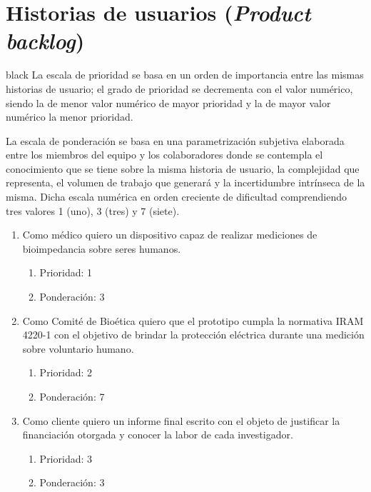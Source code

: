 \documentclass[11pt]{charter}
\begin{document}
\pagebreak

\section{Historias de usuarios (\textit{Product backlog})}
\label{sec:backlog}

\begin{consigna}{black}
La escala de prioridad se basa en un orden de importancia entre las mismas historias de usuario; el grado de prioridad se decrementa con el valor numérico, siendo la de menor valor numérico de mayor prioridad y la de mayor valor numérico la menor prioridad.

La escala de ponderación se basa en una parametrización subjetiva elaborada entre los miembros del equipo y los colaboradores donde se contempla el conocimiento que se tiene sobre la misma historia de usuario, la complejidad que representa, el volumen de trabajo que generará y la incertidumbre intrínseca de la misma. Dicha escala numérica en orden creciente de dificultad comprendiendo tres valores 1 (uno), 3 (tres) y 7 (siete).
\begin{enumerate}
\item Como médico quiero un dispositivo capaz de realizar mediciones de bioimpedancia sobre seres humanos.
\begin{enumerate}
	\item Prioridad: 1
	\item Ponderación: 3
\end{enumerate}

\item Como Comité de Bioética quiero que el prototipo cumpla la normativa IRAM 4220-1 con el objetivo de brindar la protección eléctrica durante una medición sobre voluntario humano.
\begin{enumerate}
	\item Prioridad: 2
	\item Ponderación: 7
\end{enumerate}
\item Como cliente quiero un informe final escrito con el objeto de justificar la financiación otorgada y conocer la labor de cada investigador.
\begin{enumerate}
	\item Prioridad: 3
	\item Ponderación: 3
\end{enumerate}


\end{enumerate}
\end{consigna}
\end{document}
